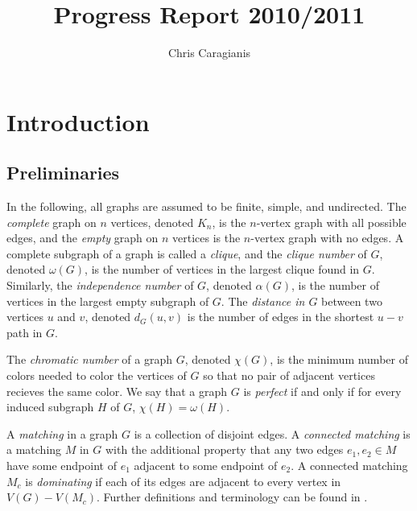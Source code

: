 \documentclass[12pt]{article}
\theoremstyle{definition}
\begin{document}
\author{Chris Caragianis}
\title{Progress Report 2010/2011}
\maketitle
\tableofcontents
\section{Introduction}
\subsection{Preliminaries}
In the following, all graphs are assumed to be finite, simple, and undirected. The \textit{complete} graph on $n$ vertices, denoted $K_n$, is the $n$-vertex graph with all possible edges, and the \textit{empty} graph on $n$ vertices is the $n$-vertex graph with no edges.  A complete subgraph of a graph is called a \textit{clique}, and the \textit{clique number} of $G$, denoted $\omega(G)$, is the number of vertices in the largest clique found in $G$.  Similarly, the \textit{independence number} of $G$, denoted $\alpha(G)$, is the number of vertices in the largest empty subgraph of $G$.  The \textit{distance in $G$} between two vertices $u$ and $v$, denoted $d_G(u,v)$ is the number of edges in the shortest $u-v$ path in $G$. 

The \textit{chromatic number} of a graph $G$, denoted $\chi(G)$, is the minimum number of colors needed to color the vertices of $G$ so that no pair of adjacent vertices recieves the same color. We say that a graph $G$ is \textit{perfect} if and only if for every induced subgraph $H$ of $G$, $\chi(H) = \omega(H)$. 

A \textit{matching} in a graph $G$ is a collection of disjoint edges.  A \textit{connected matching} is a matching $M$ in $G$ with the additional property that any two edges $e_1, e_2 \in M$ have some endpoint of $e_1$ adjacent to some endpoint of $e_2$.  A connected matching $M_c$ is \textit{dominating} if each of its edges are adjacent to every vertex in $V(G)- V(M_c)$.  Further definitions and terminology can be found in \cite{dwest}.
\end{document}
